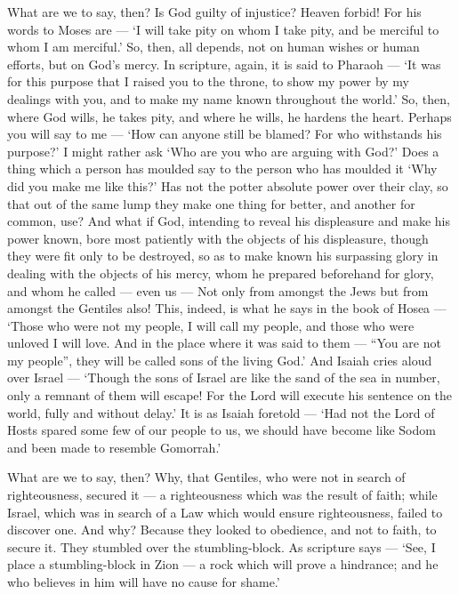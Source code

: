  What are we to say, then? Is God guilty of injustice?
Heaven forbid!  For his words to Moses are --- `I will take
pity on whom I take pity, and be merciful to whom I am merciful.'
 So, then, all depends, not on human wishes or human
efforts, but on God's mercy.  In scripture, again, it is
said to Pharaoh --- `It was for this purpose that I raised you to the
throne, to show my power by my dealings with you, and to make my name
known throughout the world.'  So, then, where God wills, he
takes pity, and where he wills, he hardens the heart. 
Perhaps you will say to me --- `How can anyone still be blamed? For who
withstands his purpose?'  I might rather ask `Who are you
who are arguing with God?' Does a thing which a person has moulded say
to the person who has moulded it `Why did you make me like this?'
 Has not the potter absolute power over their clay, so that
out of the same lump they make one thing for better, and another for
common, use?  And what if God, intending to reveal his
displeasure and make his power known, bore most patiently with the
objects of his displeasure, though they were fit only to be destroyed,
 so as to make known his surpassing glory in dealing with
the objects of his mercy, whom he prepared beforehand for glory,
 and whom he called --- even us --- Not only from amongst
the Jews but from amongst the Gentiles also!  This, indeed,
is what he says in the book of Hosea --- `Those who were not my people,
I will call my people, and those who were unloved I will love.
 And in the place where it was said to them --- ``You are
not my people'', they will be called sons of the living God.'
 And Isaiah cries aloud over Israel --- `Though the sons of
Israel are like the sand of the sea in number, only a remnant of them
will escape!  For the Lord will execute his sentence on the
world, fully and without delay.'  It is as Isaiah foretold
--- `Had not the Lord of Hosts spared some few of our people to us, we
should have become like Sodom and been made to resemble Gomorrah.'

 What are we to say, then? Why, that Gentiles, who were not
in search of righteousness, secured it --- a righteousness which was the
result of faith;  while Israel, which was in search of a
Law which would ensure righteousness, failed to discover one.
 And why? Because they looked to obedience, and not to
faith, to secure it. They stumbled over the stumbling-block.
 As scripture says --- `See, I place a stumbling-block in
Zion --- a rock which will prove a hindrance; and he who believes in him
will have no cause for shame.'

